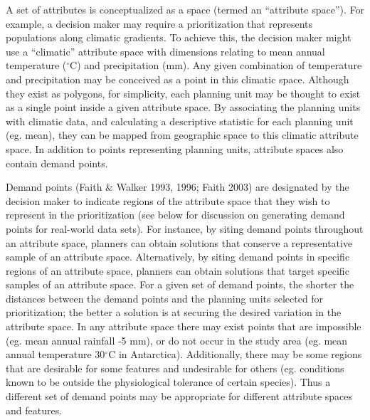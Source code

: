 A set of attributes is conceptualized as a space (termed an ``attribute
space''). For example, a decision maker may require a prioritization
that represents populations along climatic gradients. To achieve this,
the decision maker might use a ``climatic'' attribute space with
dimensions relating to mean annual temperature (\(^{\circ}\)C) and
precipitation (mm). Any given combination of temperature and
precipitation may be conceived as a point in this climatic space.
Although they exist as polygons, for simplicity, each planning unit may
be thought to exist as a single point inside a given attribute space. By
associating the planning units with climatic data, and calculating a
descriptive statistic for each planning unit (eg. mean), they can be
mapped from geographic space to this climatic attribute space. In
addition to points representing planning units, attribute spaces also
contain demand points.

Demand points (Faith \& Walker 1993, 1996; Faith 2003) are designated by
the decision maker to indicate regions of the attribute space that they
wish to represent in the prioritization (see below for discussion on
generating demand points for real-world data sets). For instance, by
siting demand points throughout an attribute space, planners can obtain
solutions that conserve a representative sample of an attribute space.
Alternatively, by siting demand points in specific regions of an
attribute space, planners can obtain solutions that target specific
samples of an attribute space. For a given set of demand points, the
shorter the distances between the demand points and the planning units
selected for prioritization; the better a solution is at securing the
desired variation in the attribute space. In any attribute space there
may exist points that are impossible (eg. mean annual rainfall -5 mm),
or do not occur in the study area (eg. mean annual temperature
30\(^{\circ}\)C in Antarctica). Additionally, there may be some regions
that are desirable for some features and undesirable for others (eg.
conditions known to be outside the physiological tolerance of certain
species). Thus a different set of demand points may be appropriate for
different attribute spaces and features.

